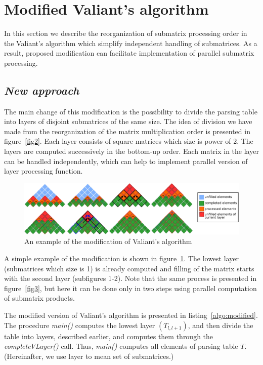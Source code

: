 \section{\bf Modified Valiant's algorithm}

In this section we describe the reorganization of submatrix processing order in the Valiant's algorithm which simplify independent handling of submatrices. As a result, proposed modification can facilitate implementation of parallel submatrix processing.

\subsection{\bf \it New approach}

The main change of this modification is the possibility to divide the parsing table into layers of disjoint submatrices of the same size.
The idea of division we have made from the reorganization of the matrix multiplication order is presented in figure~\ref{fig2}.
Each layer consists of square matrices which size is power of 2.
The layers are computed successively in the bottom-up order.
Each matrix in the layer can be handled independently, which can help to implement parallel version of layer processing function.

\begin{figure}[h]
\vspace{3mm}
 \begin{center}
 \includegraphics[width=12cm]{pictures/modivis2.pdf}
    \caption{An example of the modification of Valiant's algorithm}
    \label{fig4}
 \end{center}
\vspace{-8mm}
\end{figure}

A simple example of the modification is shown in figure~\ref{fig4}.
The lowest layer (submatrices which size is 1) is already computed and filling of the matrix starts with the second layer (subfigures 1-2).
Note that the same  process is presented in figure~\ref{fig3}, but here it can be done only in two steps using parallel computation of submatrix products.

The modified version of Valiant's algorithm is presented in listing~\ref{algo:modified}.
The procedure \textit{main()} computes the lowest layer $(T_{l, l+1})$, and then divide the table into layers, described earlier, and computes them through the \textit{completeVLayer()} call.
Thus, \textit{main()} computes all elements of parsing table $T$.
(Hereinafter, we use layer to mean set of submatrices.)

